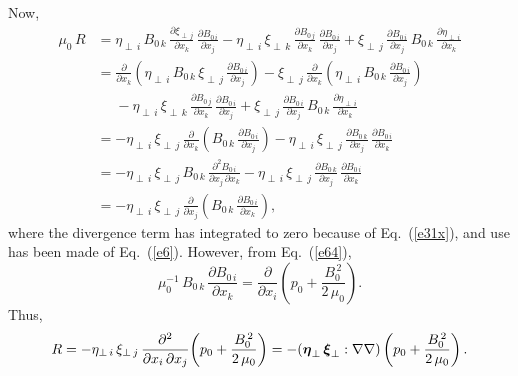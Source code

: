 \documentclass[12pt,prb,aps,notitlepage]{revtex4-1}
\newcommand{\bxi}{\mbox{\boldmath$\xi$}}
\newcommand{\bta}{\mbox{\boldmath$\eta$}}
\begin{document}
Now, 
\begin{align}
\mu_0\,R &= \eta_{\perp\,i}\,B_{0\,k}\,\frac{\partial\xi_{\perp\,j}}{\partial x_k}\,\frac{\partial B_{0\,i}}{\partial x_j}
- \eta_{\perp\,i}\,\xi_{\perp\,k}\,\frac{\partial B_{0\,j}}{\partial x_k}\,\frac{\partial B_{0\,i}}{\partial x_j}
+\xi_{\perp\,j}\,\frac{\partial B_{0\,i}}{\partial x_j}\,B_{0\,k}\,\frac{\partial\eta_{\perp\,i}}{\partial x_k}\nonumber\\[0.5ex]
&= \frac{\partial}{\partial x_k}\!\left(\eta_{\perp\,i}\,B_{0\,k}\,\xi_{\perp\,j}\,\frac{\partial B_{0\,i}}{\partial x_j}\right)
-\xi_{\perp\,j}\,\frac{\partial}{\partial x_k}\!\left(\eta_{\perp\,i}\,B_{0\,k}\,\frac{\partial B_{0\,i}}{\partial x_j}\right)\nonumber\\[0.5ex]
&\phantom{=}- \eta_{\perp\,i}\,\xi_{\perp\,k}\,\frac{\partial B_{0\,j}}{\partial x_k}\,\frac{\partial B_{0\,i}}{\partial x_j}
+\xi_{\perp\,j}\,\frac{\partial B_{0\,i}}{\partial x_j}\,B_{0\,k}\,\frac{\partial\eta_{\perp\,i}}{\partial x_k}\nonumber\\[0.5ex]
&=-\eta_{\perp\,i}\,\xi_{\perp\,j}\,\frac{\partial}{\partial x_k}\!\left(B_{0\,k}\,\frac{\partial B_{0\,i}}{\partial x_j}\right)- \eta_{\perp\,i}\,\xi_{\perp\,j}\,\frac{\partial B_{0\,k}}{\partial x_j}\,\frac{\partial B_{0\,i}}{\partial x_k}\nonumber\\[0.5ex]
&=-\eta_{\perp\,i}\,\xi_{\perp\,j}\,B_{0\,k}\,\frac{\partial^2 B_{0\,i}}{\partial x_j\,\partial x_k}- \eta_{\perp\,i}\,\xi_{\perp\,j}\,\frac{\partial B_{0\,k}}{\partial x_j}\,\frac{\partial B_{0\,i}}{\partial x_k} \nonumber\\[0.5ex]
&=- \eta_{\perp\,i}\,\xi_{\perp\,j}\,\frac{\partial}{\partial x_j}\!\left(B_{0\,k}\,\frac{\partial B_{0\,i}}{\partial x_k}\right),
\end{align}
where the divergence term has integrated to zero because of Eq.~(\ref{e31x}), and use has been made of Eq.~(\ref{e6}). 
However, from Eq.~(\ref{e64}), 
\begin{equation}
\mu_0^{-1}\,B_{0\,k}\,\frac{\partial B_{0\,i}}{\partial x_k} = \frac{\partial}{\partial x_i}\!\left(p_0 + \frac{B_0^{\,2}}{2\,\mu_0}\right).
\end{equation}
Thus,
\begin{equation}
R=  -\eta_{\perp\,i}\,\xi_{\perp\,j}\,\frac{\partial^2}{\partial x_i\,\partial x_j}\!\left(p_0 + \frac{B_0^{\,2}}{2\,\mu_0}\right)=-
(\bta_\perp\,\bxi_\perp : \nabla\nabla)\left(p_0 + \frac{B_0^{\,2}}{2\,\mu_0}\right).
\end{equation}
\end{document}
